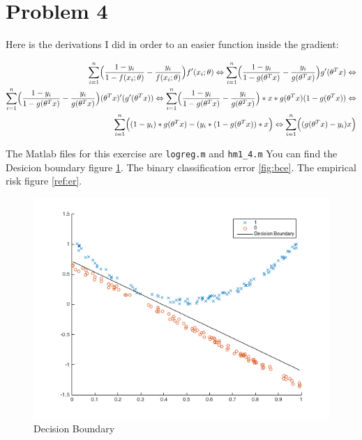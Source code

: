 \section{Problem 4}
Here is the derivations I did in order to an easier function inside
the gradient:

\begin{eqnarray*}
\sum_{i=1}^n \Bigl( \frac{1-y_i}{1-f(x_i;\theta)} - 
\frac{y_i}{f(x_i;\theta)}\Bigr)f'(x_i;\theta) \Leftrightarrow
\sum_{i=1}^n \Bigl( \frac{1-y_i}{1-g(\theta^Tx)} -
\frac{y_i}{g(\theta^Tx)}\Bigr)g'(\theta^Tx) \Leftrightarrow \\
\sum_{i=1}^n \Bigl( \frac{1-y_i}{1-g(\theta^Tx)} -
\frac{y_i}{g(\theta^Tx)}\Bigr)(\theta^Tx)'(g'(\theta^Tx)) \Leftrightarrow
\sum_{i=1}^n \Bigl( \frac{1-y_i}{1-g(\theta^Tx)} -
\frac{y_i}{g(\theta^Tx)}\Bigr)*x*g(\theta^Tx)(1-g(\theta^Tx)) \Leftrightarrow \\
\sum_{i=1}^n \Bigl( (1-y_i)*g(\theta^Tx) - (y_i*(1-g(\theta^Tx))*x\Bigr) \Leftrightarrow
\sum_{i=1}^n \Bigl( (g(\theta^Tx) - y_i)x \Bigr)
\end{eqnarray*}

The Matlab files for this exercise are \texttt{logreg.m} and \texttt{hm1\_4.m}
You can find the Desicion boundary figure \ref{fig:db}. The binary classification error \ref{fig:bce}. The empirical risk figure \ref{ref:er}.
\begin{figure}[!h]
{
    \includegraphics[width=\columnwidth]
    {figures/hm1_4_217797it.png}
    \caption{\footnotesize{\bf}Decision Boundary}
    \label{fig:db}
}
\end{figure}

